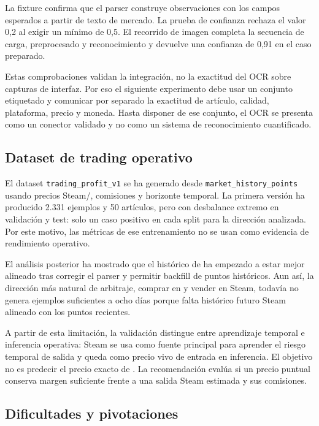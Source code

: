 La fixture confirma que el parser construye observaciones con los campos esperados a partir de texto de mercado. La prueba de confianza rechaza el valor 0,2 al exigir un mínimo de 0,5. El recorrido de imagen completa la secuencia de carga, preprocesado y reconocimiento y devuelve una confianza de 0,91 en el caso preparado.

Estas comprobaciones validan la integración, no la exactitud del OCR sobre capturas de interfaz. Por eso el siguiente experimento debe usar un conjunto etiquetado y comunicar por separado la exactitud de artículo, calidad, plataforma, precio y moneda. Hasta disponer de ese conjunto, el OCR se presenta como un conector validado y no como un sistema de reconocimiento cuantificado.

\subsection{Dataset de trading operativo}

El dataset \texttt{trading\_profit\_v1} se ha generado desde \texttt{market\_history\_points} usando precios Steam/, comisiones y horizonte temporal. La primera versión ha producido 2.331 ejemplos y 50 artículos, pero con desbalance extremo en validación y test: solo un caso positivo en cada split para la dirección analizada. Por este motivo, las métricas de ese entrenamiento no se usan como evidencia de rendimiento operativo.

El análisis posterior ha mostrado que el histórico de  ha empezado a estar mejor alineado tras corregir el parser y permitir backfill de puntos históricos. Aun así, la dirección más natural de arbitraje, comprar en  y vender en Steam, todavía no genera ejemplos suficientes a ocho días porque falta histórico futuro Steam alineado con los puntos  recientes.

A partir de esta limitación, la validación distingue entre aprendizaje temporal e inferencia operativa: Steam se usa como fuente principal para aprender el riesgo temporal de salida y  queda como precio vivo de entrada en inferencia. El objetivo no es predecir el precio exacto de . La recomendación evalúa si un precio  puntual conserva margen suficiente frente a una salida Steam estimada y sus comisiones.

\subsection{Dificultades y pivotaciones}

